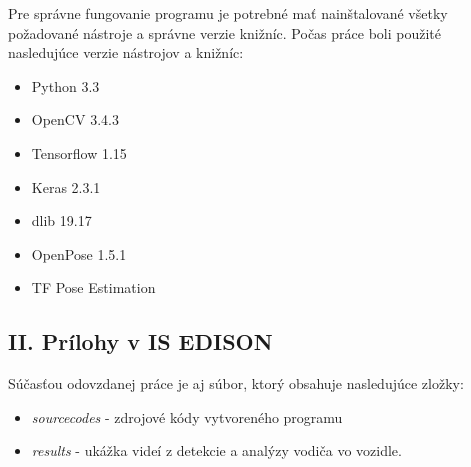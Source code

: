 \documentclass[slovak,master,dept460,male,cpp,cpdeclaration]{diploma}
\begin{document}
Pre správne fungovanie programu je potrebné mať nainštalované všetky požadované nástroje a správne verzie knižníc. Počas práce boli použité nasledujúce verzie nástrojov a knižníc:
\begin{itemize}
  \item Python 3.3
  \item OpenCV 3.4.3
  \item Tensorflow 1.15
  \item Keras 2.3.1
  \item dlib 19.17
  \item OpenPose 1.5.1
  \item TF Pose Estimation
\end{itemize}

\subsection*{II. Prílohy v IS EDISON}
Súčasťou odovzdanej práce je aj súbor, ktorý obsahuje nasledujúce zložky:
\begin{itemize}
  \item \textit{sourcecodes} - zdrojové kódy vytvoreného programu
  \item \textit{results} - ukážka videí z detekcie a analýzy vodiča vo vozidle.
\end{itemize}
\end{document}
